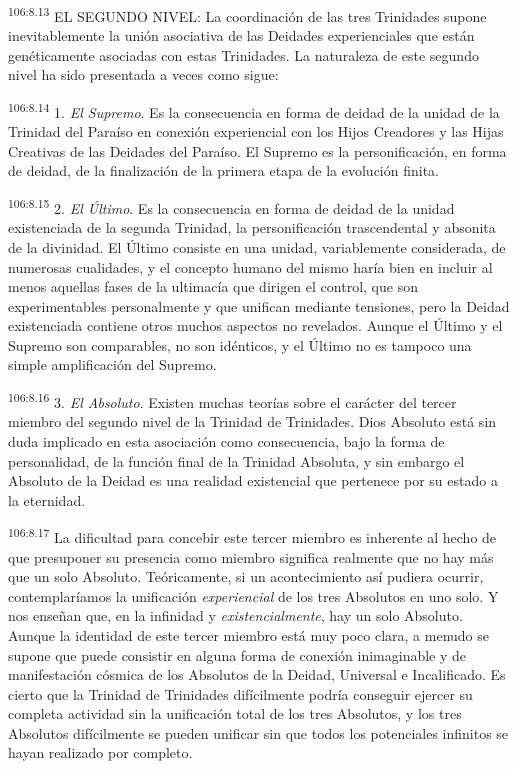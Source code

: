 \documentclass[twoside, 11pt]{book}
\begin{document}
\par
\textsuperscript{106:8.13} EL SEGUNDO NIVEL: La coordinación de las tres Trinidades supone inevitablemente la unión asociativa de las Deidades experienciales que están genéticamente asociadas con estas Trinidades. La naturaleza de este segundo nivel ha sido presentada a veces como sigue:

\par
\textsuperscript{106:8.14} 1. \textit{El Supremo}. Es la consecuencia en forma de deidad de la unidad de la Trinidad del Paraíso en conexión experiencial con los Hijos Creadores y las Hijas Creativas de las Deidades del Paraíso. El Supremo es la personificación, en forma de deidad, de la finalización de la primera etapa de la evolución finita.

\par
\textsuperscript{106:8.15} 2. \textit{El Último}. Es la consecuencia en forma de deidad de la unidad existenciada de la segunda Trinidad, la personificación trascendental y absonita de la divinidad. El Último consiste en una unidad, variablemente considerada, de numerosas cualidades, y el concepto humano del mismo haría bien en incluir al menos aquellas fases de la ultimacía que dirigen el control, que son experimentables personalmente y que unifican mediante tensiones, pero la Deidad existenciada contiene otros muchos aspectos no revelados. Aunque el Último y el Supremo son comparables, no son idénticos, y el Último no es tampoco una simple amplificación del Supremo.

\par
\textsuperscript{106:8.16} 3. \textit{El Absoluto}. Existen muchas teorías sobre el carácter del tercer miembro del segundo nivel de la Trinidad de Trinidades. Dios Absoluto está sin duda implicado en esta asociación como consecuencia, bajo la forma de personalidad, de la función final de la Trinidad Absoluta, y sin embargo el Absoluto de la Deidad es una realidad existencial que pertenece por su estado a la eternidad.

\par
\textsuperscript{106:8.17} La dificultad para concebir este tercer miembro es inherente al hecho de que presuponer su presencia como miembro significa realmente que no hay más que un solo Absoluto. Teóricamente, si un acontecimiento así pudiera ocurrir, contemplaríamos la unificación \textit{experiencial} de los tres Absolutos en uno solo. Y nos enseñan que, en la infinidad y \textit{existencialmente}, hay un solo Absoluto. Aunque la identidad de este tercer miembro está muy poco clara, a menudo se supone que puede consistir en alguna forma de conexión inimaginable y de manifestación cósmica de los Absolutos de la Deidad, Universal e Incalificado. Es cierto que la Trinidad de Trinidades difícilmente podría conseguir ejercer su completa actividad sin la unificación total de los tres Absolutos, y los tres Absolutos difícilmente se pueden unificar sin que todos los potenciales infinitos se hayan realizado por completo.
\end{document}
